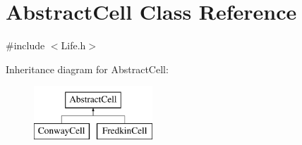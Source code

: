 \hypertarget{classAbstractCell}{\section{Abstract\-Cell Class Reference}
\label{classAbstractCell}
}


{\ttfamily \#include $<$Life.\-h$>$}

Inheritance diagram for Abstract\-Cell\-:\begin{figure}[H]
\begin{center}
\leavevmode
\includegraphics[height=2.000000cm]{classAbstractCell}
\end{center}
\end{figure}
